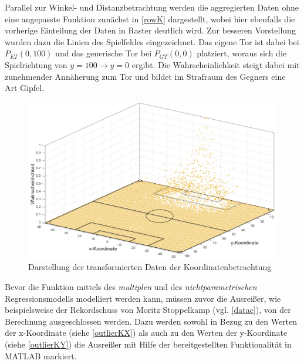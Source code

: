 Parallel zur Winkel- und Distanzbetrachtung werden die aggregierten Daten ohne eine angepasste Funktion zunächst in \vref{rowK} dargestellt, wobei hier ebenfalls die vorherige Einteilung der Daten in Raster deutlich wird. Zur besseren Vorstellung wurden dazu die Linien des Spielfeldes eingezeichnet. Das eigene Tor ist dabei bei $P_{ET}(0,100)$ und das generische Tor bei $P_{GT}(0,0)$ platziert, woraus sich die Spielrichtung von $y=100 \rightarrow y=0$ ergibt. Die Wahrscheinlichkeit steigt dabei mit zunehmender Annäherung zum Tor und bildet im Strafraum des Gegners eine Art \glqq Gipfel\grqq.

\begin{figure}[H]
\centering
\includegraphics[scale=0.345]{se-wa-jpg/rowK}
\caption{Darstellung der transformierten Daten der Koordinatenbetrachtung}
\label{rowK}
\end{figure}

Bevor die Funktion mittels des \textit{multiplen} und des \textit{nichtparametrischen} Regressionsmodells modelliert werden kann, müssen zuvor die Ausreißer, wie beispielsweise der Rekordschuss von Moritz Stoppelkamp (vgl. \vref{datac}), von der Berechnung ausgeschlossen werden. Dazu werden sowohl in Bezug zu den Werten der x-Koordinate (siehe \vref{outlierKX}) als auch zu den Werten der y-Koordinate (siehe \vref{outlierKY}) die Ausreißer mit Hilfe der bereitgestellten Funktionalität in MATLAB markiert.

